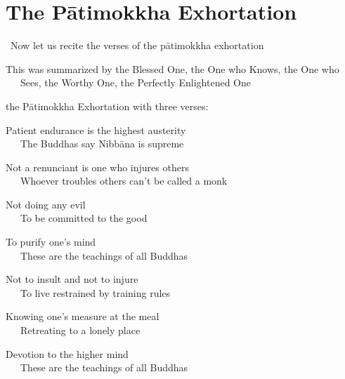 \suttaRef{[Dhp 183-185]}

\clearpage



\section{The Pātimokkha Exhortation}
\label{ovada-patimokkha-gatha-english}

\begin{intro}
	\anglebracketleft\ \hspace{-0.5mm}Now let us recite the verses of the pātimokkha exhortation \hspace{-0.5mm}\anglebracketright\
\end{intro}

\begin{hanging-indent}
This was summarized by the Blessed One, the One who Knows, the One who Sees, the Worthy One, the Perfectly Enlightened One
\end{hanging-indent}
the Pātimokkha Exhortation with three verses:
\begin{hanging-indent}
Patient endurance is the highest austerity\\
The Buddhas say Nibbāna is supreme
\end{hanging-indent}

\begin{hanging-indent}
Not a renunciant is one who injures others\\
Whoever troubles others can't be called a monk
\end{hanging-indent}

\begin{hanging-indent}
Not doing any evil\\
To be committed to the good
\end{hanging-indent}

\begin{hanging-indent}
To purify one's mind\\
These are the teachings of all Buddhas
\end{hanging-indent}

\begin{hanging-indent}
Not to insult and not to injure\\
To live restrained by training rules
\end{hanging-indent}

\begin{hanging-indent}
Knowing one's measure at the meal\\
Retreating to a lonely place
\end{hanging-indent}

\begin{hanging-indent}
Devotion to the higher mind\\
These are the teachings of all Buddhas
\end{hanging-indent}

\suttaRef{[Dhp 183-185]}

\clearpage

